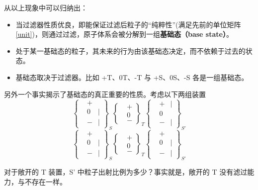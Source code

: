 \documentclass[12pt,a4paper,oneside]{book}
\begin{document}
从以上现象中可以归纳出：\begin{itemize}
    \item 当过滤器性质优良，即能保证过滤后粒子的“纯粹性”(满足先前的单位矩阵 \ref{unit})，则通过过滤，原子体系会被分解到一组\textbf{基础态（base state）}。
    \item 处于某一基础态的粒子，其未来的行为由该基础态决定，而不依赖于过去的状态。
    \item 基础态取决于过滤器。比如 +T、0T、-T 与 +S、0S、-S 各是一组基础态。
\end{itemize}

另外一个事实揭示了基础态的真正重要的性质。考虑以下两组装置
\begin{equation*}
\left\{\begin{aligned}
    &+ \\
    &0&\boldsymbol{|}\\
    &-&\boldsymbol{|}
    \end{aligned}\right\}_S
    \left\{\begin{aligned}
    &+ \\
    &0\\
    &-
    \end{aligned}\right\}_T
    \left\{\begin{aligned}
    &+&\boldsymbol{|} \\
    &0\\
    &-&\boldsymbol{|}
    \end{aligned}\right\}_{S'}
\end{equation*}
\begin{equation*}
\left\{\begin{aligned}
        &+ \\
        &0&\boldsymbol{|}\\
        &-&\boldsymbol{|}
        \end{aligned}\right\}_S
        \left\{\begin{aligned}
        &+ \\
        &0\\
        &-
        \end{aligned}\right\}_T
        \left\{\begin{aligned}
        &+ \\
        &0&\boldsymbol{|}\\
        &-&\boldsymbol{|}
\end{aligned}\right\}_{S'}
\end{equation*}

对于敞开的 T 装置，S' 中粒子出射比例为多少？事实就是，敞开的 T 没有滤过能力，与不存在一样。
\end{document}
